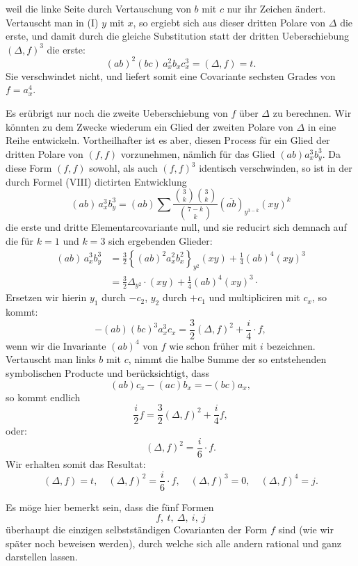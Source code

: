 \documentclass[11pt]{article}
\providecommand{\weberpage}[1]{}
\providecommand{\weq}[2]{\begin{equation}\tag{#1}#2\end{equation}}
\let\Delta\varDelta
\begin{document}
\weberpage{92}
weil die linke Seite durch Vertauschung von $b$ mit $c$ nur ihr Zeichen \"andert. Vertauscht man in (I) $y$ mit $x$, so ergiebt sich aus dieser dritten Polare von $\Delta$ die erste, und damit durch die gleiche Substitution statt der dritten Ueberschiebung $(\Delta, f)^3$ die erste:
\weq{3}{(ab)^2 (bc)\, a_x^2 b_x c_x^3 = (\Delta, f) = t.}
Sie verschwindet nicht, und liefert somit eine Covariante sechsten Grades von $f = a_x^4$.

Es er\"ubrigt nur noch die zweite Ueberschiebung von $f$ \"uber $\Delta$ zu berechnen. Wir k\"onnten zu dem Zwecke wiederum ein Glied der zweiten Polare von $\Delta$ in eine Reihe entwickeln. Vortheilhafter ist es aber, diesen Process f\"ur ein Glied der dritten Polare von $(f,f)$ vorzunehmen, n\"amlich f\"ur das Glied $(ab)a_x^3 b_y^3$. Da diese Form $(f,f)$ sowohl, als auch $(f,f)^3$ identisch verschwinden, so ist in der durch Formel (VIII) dictirten Entwicklung
\[
(ab)\,a_x^3 b_y^3 = (ab) \sum \frac{\binom{3}{k}\binom{3}{k}}{\binom{7-k}{k}} (\overline{ab})_{y^{3-k}} (xy)^k
\]
die erste und dritte Elementarcovariante null, und sie reducirt sich demnach auf die f\"ur $k=1$ und $k=3$ sich ergebenden Glieder:
\[
\begin{aligned}
(ab)\,a_x^3 b_y^3 &= \frac{3}{2}\left\{(ab)^2 a_x^2 b_x^2\right\}_{y^2} (xy) + \frac{1}{4}(ab)^4 (xy)^3 \\
&= \frac{3}{2}\Delta_{y^2}\cdot (xy) + \frac{1}{4}(ab)^4 (xy)^3\cdot
\end{aligned}
\]
Ersetzen wir hierin $y_1$ durch $-c_2$, $y_2$ durch $+c_1$ und multipliciren mit $c_x$, so kommt:
\[
-(ab)(bc)^3 a_x^3 c_x = \frac{3}{2}(\Delta, f)^2 + \frac{i}{4} \cdot f,
\]
wenn wir die Invariante $(ab)^4$ von $f$ wie schon fr\"uher mit $i$ bezeichnen. Vertauscht man links $b$ mit $c$, nimmt die halbe Summe der so entstehenden symbolischen Producte und ber\"ucksichtigt, dass
\[
(ab)c_x - (ac)b_x = -(bc)a_x,
\]
so kommt endlich
\[
\frac{i}{2} f = \frac{3}{2}(\Delta, f)^2 + \frac{i}{4} f,
\]
oder:
\weq{4}{(\Delta, f)^2 = \frac{i}{6} \cdot f.}
Wir erhalten somit das Resultat:
\[
(\Delta, f) = t, \quad (\Delta, f)^2 = \frac{i}{6} \cdot f, \quad (\Delta, f)^3 = 0, \quad (\Delta, f)^4 = j.
\]


\weberpage{93}
Es möge hier bemerkt sein, dass die fünf Formen
\[
f,\ t,\ \Delta,\ i,\ j
\]
überhaupt die einzigen selbstständigen Covarianten der Form $f$ sind (wie wir später noch beweisen werden), durch welche sich alle andern rational und ganz darstellen lassen.
\end{document}
